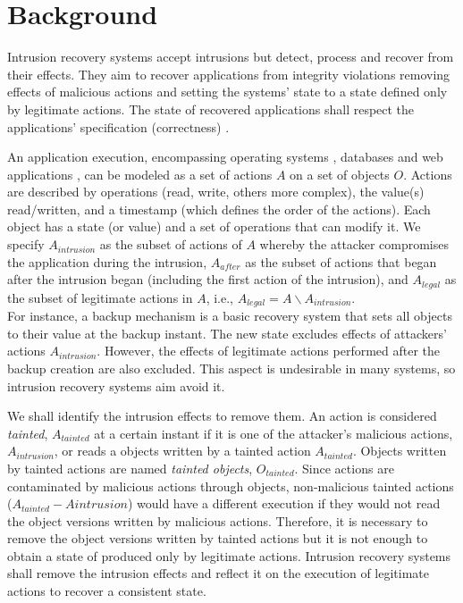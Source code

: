 
\section{Background}\label{sec:background}
Intrusion recovery systems accept intrusions but detect, process and recover from their effects. They aim to recover applications from integrity violations removing effects of malicious actions and setting the systems' state to a state defined only by legitimate actions. The state of recovered applications shall respect the applications' specification (correctness) .

An application execution, encompassing operating systems \cite{taser,retro}, databases \cite{itdb,phoenix} and web applications \cite{goel,warp,aire}, can be modeled as a set of actions $A$ on a set of objects $O$. Actions are described by operations (read, write, others more complex), the value(s) read/written, and a timestamp (which defines the order of the actions). Each object has a state (or value) and a set of operations that can modify it. We specify $A_{intrusion}$ as the subset of actions of $A$ whereby the attacker compromises the application during the intrusion, $A_{after}$ as the subset of actions that began after the intrusion began (including the first action of the intrusion), and $A_{legal}$ as the subset of legitimate actions in $A$, i.e., $A_{legal} = A \backslash A_{intrusion}$.\\

For instance, a backup mechanism is a basic recovery system that sets all objects to their value at the backup instant. The new state excludes effects of attackers' actions $A_{intrusion}$. However, the effects of legitimate actions performed after the backup creation are also excluded. This aspect is undesirable in many systems, so intrusion recovery systems aim avoid it.

We shall identify the intrusion effects to remove them. An action is considered \textit{tainted}, $A_{tainted}$ at a certain instant if it is one of the attacker's malicious actions, $A_{intrusion}$, or reads a objects written by a tainted action $A_{tainted}$. Objects written by tainted actions are named \textit{tainted objects}, $O_{tainted}$. Since actions are contaminated by malicious actions through objects, non-malicious tainted actions ($A_{tainted}-A{intrusion}$) would have a different execution if they would not read the object versions written by malicious actions. Therefore, it is necessary to remove the object versions written by tainted actions but it is not enough to obtain a state of produced only by legitimate actions. Intrusion recovery systems shall remove the intrusion effects and reflect it on the execution of legitimate actions to recover a consistent state.\\

